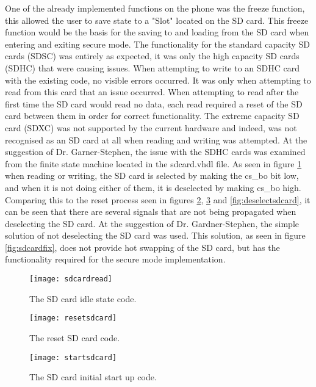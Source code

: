 One of the already implemented functions on the phone was the freeze function, this allowed the user to save state to a "Slot" located on the SD card. This freeze function would be the basis for the saving to and loading from the SD card when entering and exiting secure mode. The functionality for the standard capacity SD cards (SDSC) was entirely as expected, it was only the high capacity SD cards (SDHC) that were causing issues. When attempting to write to an SDHC card with the existing code, no visible errors occurred. It was only when attempting to read from this card that an issue occurred. When attempting to read after the first time the SD card would read no data, each read required a reset of the SD card between them in order for correct functionality. The extreme capacity SD card (SDXC) was not supported by the current hardware and indeed, was not recognised as an SD card at all when reading and writing was attempted. At the suggestion of Dr. Garner-Stephen, the issue with the SDHC cards was examined from the finite state machine located in the sdcard.vhdl file. As seen in figure \ref{fig:sdcardread} when reading or writing, the SD card is selected by making the cs\_bo bit low, and when it is not doing either of them, it is deselected by making cs\_bo high. Comparing this to the reset process seen in figures \ref{fig:resetsdcard}, \ref{fig:startsdcard} and \ref{fig:deselectsdcard}, it can be seen that there are several signals that are not being propagated when deselecting the SD card. At the suggestion of Dr. Gardner-Stephen, the simple solution of not deselecting the SD card was used. This solution, as seen in figure \ref{fig:sdcardfix}, does not provide hot swapping of the SD card, but has the functionality required for the secure mode implementation.

\begin{figure}
  \centering
  \texttt{[image: sdcardread]}
  \caption{The SD card idle state code.}
  \label{fig:sdcardread}
\end{figure}

\begin{figure}
  \centering
  \texttt{[image: resetsdcard]}
  \caption{The reset SD card code.}
  \label{fig:resetsdcard}
\end{figure}

\begin{figure}
  \centering
  \texttt{[image: startsdcard]}
  \caption{The SD card initial start up code.}
  \label{fig:startsdcard}
\end{figure}


